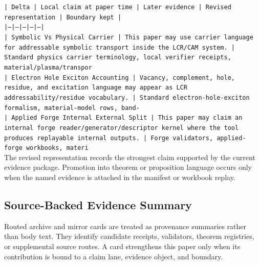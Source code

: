 \documentclass[11pt]{article}
\begin{document}
\noindent\texttt{| Delta | Local claim at paper time | Later evidence | Revised representation | Boundary kept |}\\
\noindent\texttt{|---|---|---|---|---|}\\
\noindent\texttt{| Symbolic Vs Physical Carrier | This paper may use carrier language for addressable symbolic transport inside the LCR/CAM system. | Standard physics carrier terminology, local verifier receipts, material/plasma/transpor}\\
\noindent\texttt{| Electron Hole Exciton Accounting | Vacancy, complement, hole, residue, and excitation language may appear as LCR addressability/residue vocabulary. | Standard electron-hole-exciton formalism, material-model rows, band-}\\
\noindent\texttt{| Applied Forge Internal External Split | This paper may claim an internal forge reader/generator/descriptor kernel where the tool produces replayable internal outputs. | Forge validators, applied-forge workbooks, materi}\\

The revised representation records the strongest claim supported by the current evidence package. Promotion into theorem or proposition language occurs only when the named evidence is attached in the manifest or workbook replay.

\subsection*{Source-Backed Evidence Summary}

Routed archive and mirror cards are treated as provenance summaries rather than
body text. They identify candidate receipts, validators, theorem registries, or
supplemental source routes. A card strengthens this paper only when its
contribution is bound to a claim lane, evidence object, and boundary.
\end{document}
